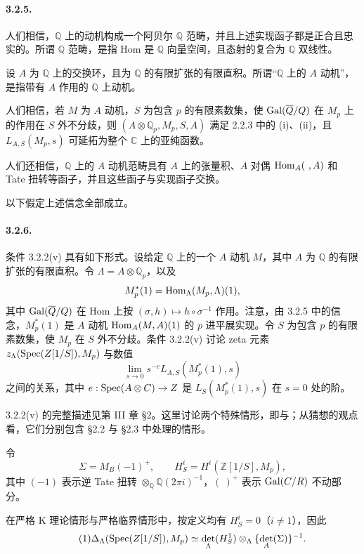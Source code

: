 \paragraph{3.2.5.} 人们相信，$\mathbb Q$ 上的动机构成一个阿贝尔 $\mathbb Q$ 范畴，并且上述实现函子都是正合且忠实的。所谓 $\mathbb Q$ 范畴，是指 Hom 是 $\mathbb Q$ 向量空间，且态射的复合为 $\mathbb Q$ 双线性。

设 $A$ 为 $\mathbb Q$ 上的交换环，且为 $\mathbb Q$ 的有限扩张的有限直积。所谓“$\mathbb Q$ 上的 $A$ 动机”，是指带有 $A$ 作用的 $\mathbb Q$ 上动机。

人们相信，若 $M$ 为 $A$ 动机，$S$ 为包含 $p$ 的有限素数集，使 $\operatorname{Gal}(\overline{Q}/Q)$ 在 $M_p$ 上的作用在 $S$ 外不分歧，则 $(A\otimes\mathbb Q_p,M_p,S,A)$ 满足 2.2.3 中的 (i)、(ii)，且 $L_{A,S}(M_p,s)$ 可延拓为整个 $\mathbb C$ 上的亚纯函数。

人们还相信，$\mathbb Q$ 上的 $A$ 动机范畴具有 $A$ 上的张量积、$A$ 对偶 $\operatorname{Hom}_A(\ ,A)$ 和 Tate 扭转等函子，并且这些函子与实现函子交换。

以下假定上述信念全部成立。

\paragraph{3.2.6.} 条件 3.2.2(v) 具有如下形式。设给定 $\mathbb Q$ 上的一个 $A$ 动机 $M$，其中 $A$ 为 $\mathbb Q$ 的有限扩张的有限直积。令 $\Lambda=A\otimes\mathbb Q_p$，以及
\[
 M_p^*(1)=\operatorname{Hom}_\Lambda(M_p,\Lambda)(1),
\]
其中 $\operatorname{Gal}(\overline{Q}/Q)$ 在 Hom 上按 $(\sigma,h)\mapsto h\circ\sigma^{-1}$ 作用。注意，由 3.2.5 中的信念，$M_p^*(1)$ 是 $A$ 动机 $\operatorname{Hom}_A(M,A)(1)$ 的 $p$ 进平展实现。令 $S$ 为包含 $p$ 的有限素数集，使 $M_p$ 在 $S$ 外不分歧。条件 3.2.2(v) 讨论 zeta 元素 $z_\Lambda(\operatorname{Spec}(Z[1/S]),M_p)$ 与数值
\[
 \lim_{s\to0}s^{-e}L_{A,S}(M_p^*(1),s)
\]
之间的关系，其中 $e:\operatorname{Spec}(A\otimes C)\to Z$ 是 $L_S(M_p^*(1),s)$ 在 $s=0$ 处的阶。

3.2.2(v) 的完整描述见第 III 章 §2。这里讨论两个特殊情形，即与；从猜想的观点看，它们分别包含 §2.2 与 §2.3 中处理的情形。

令
\[
 \Sigma=M_B(-1)^+,\qquad H^i_S=H^i(\mathbb Z[1/S],M_p),
\]
其中 $(-1)$ 表示逆 Tate 扭转 $\otimes_{\mathbb Q}\mathbb Q(2\pi i)^{-1}$，$(\ )^+$ 表示 $\operatorname{Gal}(C/R)$ 不动部分。

在严格 K 理论情形与严格临界情形中，按定义均有 $H^i_S=0$（$i\ne1$），因此
\begin{equation*}\tag{1}
 \Delta_\Lambda(\operatorname{Spec}(Z[1/S]),M_p)
 \simeq\det_\Lambda(H^1_S)\otimes_\Lambda\{\det_A(\Sigma)\}^{-1}.
\end{equation*}


